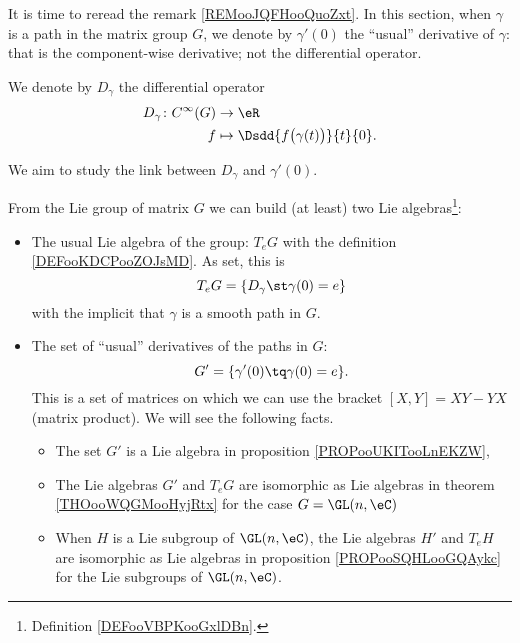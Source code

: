 \begin{normaltext}      \label{NORMooHZGKooJEiamo}
    It is time to reread the remark \ref{REMooJQFHooQuoZxt}. In this section, when \( \gamma\) is a path in the matrix group \( G\), we denote by \( \gamma'(0)\) the ``usual'' derivative of \( \gamma\): that is the component-wise derivative; not the differential operator.

    We denote by \( D_{\gamma}\) the differential operator
    \begin{equation}
        \begin{aligned}
            D_{\gamma}\colon  C^{\infty}(G)&\to \eR \\
            f&\mapsto \Dsdd{ f\big( \gamma(t) \big) }{t}{0}. 
        \end{aligned}
    \end{equation}

    We aim to study the link between \( D_{\gamma}\) and \( \gamma'(0)\).

    From the Lie group of matrix \( G\) we can build (at least) two Lie algebras\footnote{Definition \ref{DEFooVBPKooGxlDBn}.}:
    \begin{itemize}
        \item The usual Lie algebra of the group: \( T_eG\) with the definition \ref{DEFooKDCPooZOJsMD}. As set, this is
            \begin{equation}
                T_eG=\{ D_{\gamma}\st \gamma(0)=e \}
            \end{equation}
            with the implicit that \( \gamma\) is a smooth path in \( G\).
        \item 
            The set of ``usual'' derivatives of the paths in \( G\):
            \begin{equation}
                G'=\{ \gamma'(0)\tq \gamma(0)=e \}.
            \end{equation}
            This is a set of matrices on which we can use the bracket \( [X,Y]=XY-YX\) (matrix product). We will see the following facts.
            \begin{itemize}
                \item 
                    The set \( G'\) is a Lie algebra in proposition \ref{PROPooUKITooLnEKZW},
                \item
                    The Lie algebras \( G'\) and \( T_eG\) are isomorphic as Lie algebras in theorem \ref{THOooWQGMooHyjRtx} for the case \( G=\GL(n,\eC)\)
                \item
                    When \( H\) is a Lie subgroup of \( \GL(n,\eC)\), the Lie algebras \( H'\) and \( T_eH\) are isomorphic as Lie algebras in proposition \ref{PROPooSQHLooGQAykc} for the Lie subgroups of \( \GL(n,\eC)\).
            \end{itemize}
    \end{itemize}
\end{normaltext}

